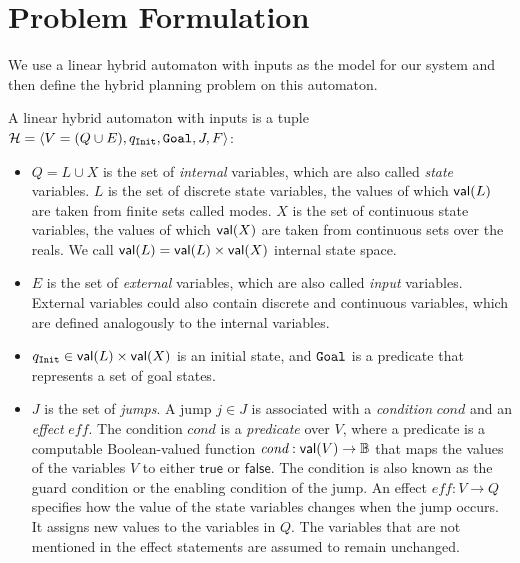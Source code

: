\documentclass[sigconf]{acmart}
\newcommand{\true}{\mathsf{true}}
\newcommand{\false}{\mathsf{false}}
\begin{document}
\section{Problem Formulation}\label{section:formulation}
We use a linear hybrid automaton with inputs as the model for our system and then define the hybrid planning problem on this automaton.
\begin{definition} 
\label{def:HA}
A linear hybrid automaton with inputs is a tuple $\mathcal{H} = \langle V = (Q \cup E), q_\mathtt{Init}, \mathtt{Goal}, J, F \rangle $:
\begin{itemize}
    \item $Q = L \cup X$ is the set of {\em internal} variables, which are also called {\em state} variables. $L$ is the set of discrete state variables, the values of which ${\mathsf{val}}(L)$ are taken from finite sets called modes. $X$ is the set of continuous state variables, the values of which ${\mathsf{val}}(X)$ are taken from continuous sets over the reals. We call ${\mathsf{val}}(L) = {\mathsf{val}}(L) \times {\mathsf{val}}(X)$ internal state space.
    
    \item  $E$ is the set of {\em external} variables, which are also called {\em input} variables. External variables could also contain discrete and continuous variables, which are defined analogously to the internal variables. 
    
    \item $q_\mathtt{Init} \in {\mathsf{val}}(L) \times {\mathsf{val}}(X)$ is an initial state, and $\mathtt{Goal}$ is a predicate that represents a set of goal states.
    
    
    \item $J$ is the set of {\em jumps}. A jump $j \in J$ is associated with a {\em condition} $\textit{cond}$ and an {\em effect} $\textit{eff}$. The condition $\textit{cond}$ is a {\em predicate} over $V$, where a predicate is a computable Boolean-valued function $\textit{cond} : {\mathsf{val}}(V) \rightarrow \mathbb{B}$ that maps the values of the variables $V$ to either $\true$ or $\false$. The condition is also known as the guard condition or the enabling condition of the jump.
    An effect $\textit{eff}: V \rightarrow Q$ specifies how the value of the state variables changes when the jump occurs. It assigns new values to the variables in $Q$.
    The variables that are not mentioned in the effect statements are assumed to remain unchanged.
    

\end{itemize}
\end{definition}
\end{document}

